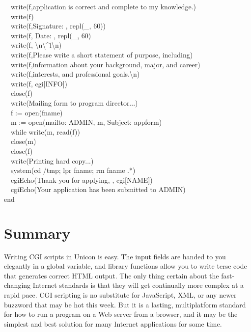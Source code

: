 {\ \ write(f,{\textquotedbl}application is correct and complete to my
knowledge.{\textquotedbl}) \\
\ \ write(f) \\
\ \ write(f,{\textquotedbl}Signature: {\textquotedbl},
repl({\textquotedbl}\_{\textquotedbl}, 60)) \\
\ \ write(f,{\textquotedbl} Date: {\textquotedbl},
repl({\textquotedbl}\_{\textquotedbl}, 60) \\
\ \ write(f,
{\textquotedbl}{\textbackslash}n{\textbackslash}\^{}l{\textbackslash}n{\textquotedbl}) \\
\ \ write(f,{\textquotedbl}Please write a short statement of purpose,
including{\textquotedbl}) \\
\ \ write(f,{\textquotedbl}information about your background, major, and
career{\textquotedbl}) \\
\ \ write(f,{\textquotedbl}interests, and professional
goals.{\textbackslash}n{\textquotedbl}) \\
\ \ write(f, cgi[{\textquotedbl}INFO{\textquotedbl}]) \\
\ \ close(f) \\
\ \ write({\textquotedbl}Mailing form to program director...{\textquotedbl}) \\
\ \ f := open(fname) \\
\ \ m := open({\textquotedbl}mailto:{\textquotedbl} {\textbar}{\textbar}
ADMIN, {\textquotedbl}m{\textquotedbl}, {\textquotedbl}Subject:
appform{\textquotedbl}) \\
\ \ while write(m, read(f)) \\
\ \ close(m) \\
\ \ close(f) \\
\ \ write({\textquotedbl}Printing hard copy...{\textquotedbl}) \\
\ \ system({\textquotedbl}cd /tmp; lpr {\textquotedbl}
{\textbar}{\textbar} fname; rm {\textquotedbl} {\textbar}{\textbar}
fname {\textbar}{\textbar} {\textquotedbl}.*{\textquotedbl}) \\
\ \ cgiEcho({\textquotedbl}Thank you for applying, {\textquotedbl},
cgi[{\textquotedbl}NAME{\textquotedbl}]) \\
\ \ cgiEcho({\textquotedbl}Your application has been submitted to
{\textquotedbl} {\textbar}{\textbar} ADMIN) \\
end
}

\section*{Summary}

Writing CGI scripts in Unicon is easy. The input fields are handed to
you elegantly in a global variable, and library functions allow you to
write terse code that generates correct HTML output. The only thing
certain about the fast-changing Internet standards is that they will
get continually more complex at a rapid pace. CGI scripting is no
substitute for JavaScript, XML, or any
newer buzzword that may be hot this week. But it is a lasting,
multiplatform standard for how to run a program on a Web server from a
browser, and it may be the simplest and best solution for many Internet
applications for some time.
